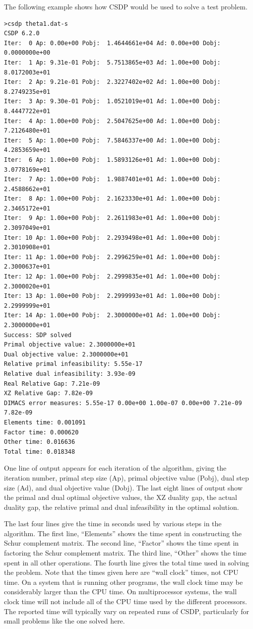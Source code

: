 \documentclass{article}
\begin{document}
The following example shows how CSDP would be used to solve a test problem.
\begin{verbatim}
>csdp theta1.dat-s
CSDP 6.2.0
Iter:  0 Ap: 0.00e+00 Pobj:  1.4644661e+04 Ad: 0.00e+00 Dobj:  0.0000000e+00 
Iter:  1 Ap: 9.31e-01 Pobj:  5.7513865e+03 Ad: 1.00e+00 Dobj:  8.0172003e+01 
Iter:  2 Ap: 9.21e-01 Pobj:  2.3227402e+02 Ad: 1.00e+00 Dobj:  8.2749235e+01 
Iter:  3 Ap: 9.30e-01 Pobj:  1.0521019e+01 Ad: 1.00e+00 Dobj:  8.4447722e+01 
Iter:  4 Ap: 1.00e+00 Pobj:  2.5047625e+00 Ad: 1.00e+00 Dobj:  7.2126480e+01 
Iter:  5 Ap: 1.00e+00 Pobj:  7.5846337e+00 Ad: 1.00e+00 Dobj:  4.2853659e+01 
Iter:  6 Ap: 1.00e+00 Pobj:  1.5893126e+01 Ad: 1.00e+00 Dobj:  3.0778169e+01 
Iter:  7 Ap: 1.00e+00 Pobj:  1.9887401e+01 Ad: 1.00e+00 Dobj:  2.4588662e+01 
Iter:  8 Ap: 1.00e+00 Pobj:  2.1623330e+01 Ad: 1.00e+00 Dobj:  2.3465172e+01 
Iter:  9 Ap: 1.00e+00 Pobj:  2.2611983e+01 Ad: 1.00e+00 Dobj:  2.3097049e+01 
Iter: 10 Ap: 1.00e+00 Pobj:  2.2939498e+01 Ad: 1.00e+00 Dobj:  2.3010908e+01 
Iter: 11 Ap: 1.00e+00 Pobj:  2.2996259e+01 Ad: 1.00e+00 Dobj:  2.3000637e+01 
Iter: 12 Ap: 1.00e+00 Pobj:  2.2999835e+01 Ad: 1.00e+00 Dobj:  2.3000020e+01 
Iter: 13 Ap: 1.00e+00 Pobj:  2.2999993e+01 Ad: 1.00e+00 Dobj:  2.2999999e+01 
Iter: 14 Ap: 1.00e+00 Pobj:  2.3000000e+01 Ad: 1.00e+00 Dobj:  2.3000000e+01 
Success: SDP solved
Primal objective value: 2.3000000e+01 
Dual objective value: 2.3000000e+01 
Relative primal infeasibility: 5.55e-17 
Relative dual infeasibility: 3.93e-09 
Real Relative Gap: 7.21e-09 
XZ Relative Gap: 7.82e-09 
DIMACS error measures: 5.55e-17 0.00e+00 1.00e-07 0.00e+00 7.21e-09 7.82e-09
Elements time: 0.001091 
Factor time: 0.000620 
Other time: 0.016636 
Total time: 0.018348 
\end{verbatim} 

One line of output appears for each iteration of the algorithm, giving
the iteration number, primal step size (Ap), primal objective value
(Pobj), dual step size (Ad), and dual objective value (Dobj).  The
last eight lines of output show the primal and dual optimal objective
values, the XZ duality gap, the actual duality gap, the relative
primal and dual infeasibility in the optimal solution.

The last four lines give the time in seconds used by various steps in
the algorithm.  The first line, ``Elements'' shows the time spent in
constructing the Schur complement matrix.  The second line, ``Factor''
shows the time spent in factoring the Schur complement matrix.  The
third line, ``Other'' shows the time spent in all other operations.
The fourth line gives the total time used in solving the problem.
Note that the times given here are ``wall clock'' times, not CPU time.
On a system that is running other programs, the wall clock time may be
considerably larger than the CPU time.  On multiprocessor systems, the
wall clock time will not include all of the CPU time used by the
different processors.  The reported time will typically vary on
repeated runs of CSDP, particularly for small problems like the one
solved here.
\end{document}
